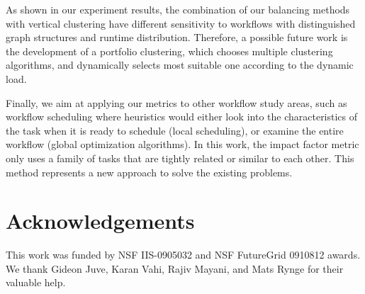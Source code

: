 \documentclass[final,5p,times,twocolumn]{elsarticle}
\begin{document}
As shown in our experiment results, the combination of our balancing methods with vertical clustering have different sensitivity to workflows with distinguished graph structures and runtime distribution. Therefore, a possible future work is the development of a portfolio clustering, which chooses multiple clustering algorithms, and dynamically selects most suitable one according to the dynamic load.


Finally, we aim at applying our metrics to other workflow study areas, such as workflow scheduling where heuristics would either look into the characteristics of the task when it is ready to schedule (local scheduling), or examine the entire workflow (global optimization algorithms). In this work, the impact factor metric only uses a family of tasks that are tightly related or similar to each other. This method represents a new approach to solve the existing problems. 

\section*{Acknowledgements}
\footnotesize
This work was funded by NSF IIS-0905032 and NSF FutureGrid 0910812 awards. We thank Gideon Juve, Karan Vahi, Rajiv Mayani, and Mats Rynge for their valuable help. 




\end{document}
